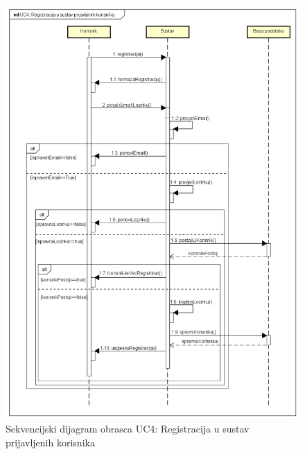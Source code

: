 				\begin{figure}[H]
					\includegraphics[width=\textwidth]{slike/uc4Sekvencijski.PNG} %
					\caption{Sekvencijski dijagram obrasca UC4: Registracija u sustav prijavljenih korisnika}
					\label{fig:uc4-sekvencijski} %
				\end{figure}
				\eject
				
